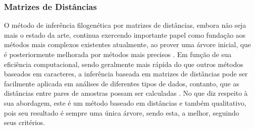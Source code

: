 \documentclass[english,brazilian]{UNISINOSmonografia} %
\begin{document}
%
%
%
%


\subsubsection{Matrizes de Distâncias}


O método de inferência filogenética por matrizes de distâncias, embora não seja mais o estado da arte, continua exercendo importante papel como fundação aos métodos mais complexos existentes atualmente, ao prover uma árvore inicial, que é posteriormente melhorada por métodos mais precisos \cite{Guindon2003,Vinh2004}.
Em função de sua eficiência computacional, sendo geralmente mais rápida do que outros métodos baseados em caracteres, a inferência baseada em matrizes de distâncias pode ser facilmente aplicada em análises de diferentes tipos de dados, contanto, que as distâncias entre pares de amostras possam ser calculadas \cite{yang2014molecular}.
No que diz respeito à sua abordagem, este é um método baseado em distâncias e também qualitativo, pois seu resultado é sempre uma única árvore, sendo esta, a melhor, seguindo seus critérios.
\end{document}
